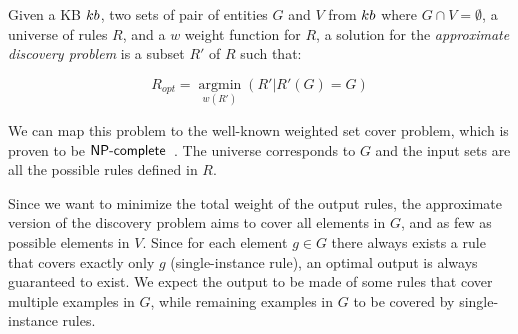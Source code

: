 \begin{definition}
	Given a KB ${\sc kb}$, two sets of pair of entities $G$ and $V$ from ${\sc kb}$ where $G \cap V = \emptyset$, a universe of rules $R$, and a $w$ weight function for $R$,
	a solution for the \emph{approximate discovery problem} is a subset $R'$ of $R$  such that:
	
	$$R_{opt}=\underset{w(R')}{\operatorname{argmin}}(R'|R'(G) = G)$$
\end{definition}

We can map this problem to the well-known weighted set cover problem, which is proven to be $\textsf{NP\mbox{-}complete}$~\cite{chvatal1979greedy}. The universe corresponds to $G$ and the input sets are all the possible rules defined in $R$.

Since we want to minimize the total weight of the output rules, the approximate version of the discovery problem aims to cover all elements in $G$, and as few as possible elements in $V$. Since for each element $g \in G$ there always exists a rule that covers exactly only $g$ (single-instance rule), an optimal output is always guaranteed to exist. We expect the output to be made of some rules that cover multiple examples in $G$, while remaining examples in $G$ to be covered by single-instance rules. 


